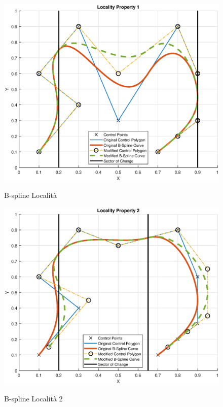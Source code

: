 \documentclass[a4paper, 12pt]{article}
\begin{document}


 \newpage

\begin{figure}[h!]
	\centering
	\caption{B-spline Località}
	\includegraphics[scale=0.5]{locality_plot.eps}
	\label{fig:locality}
\end{figure}

\begin{figure}[h!]
	\centering
	\caption{B-spline Località 2}
	\includegraphics[scale=0.5]{locality_2_plot.eps}
	\label{fig:locality2}
\end{figure}
\end{document}
